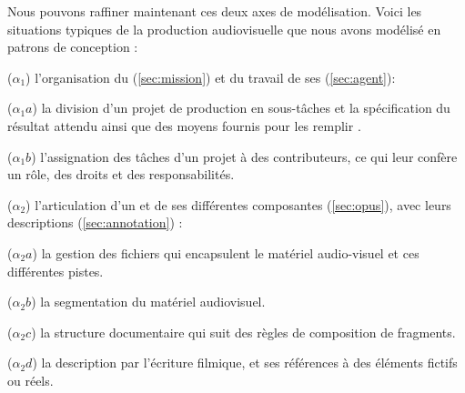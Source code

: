 Nous pouvons raffiner maintenant ces deux axes de modélisation. 
Voici les situations typiques de la production audiovisuelle que nous avons modélisé en patrons de conception : 
\begin{listeni}
	\item[($\alpha_1$)] l'organisation du  (\ref{sec:mission}) et du travail de ses  (\ref{sec:agent}): 
	\begin{liste}
		\item[($\alpha_1a$)] la division d'un projet de production en sous-tâches et la spécification du résultat attendu ainsi que des moyens fournis pour les remplir .

		\item[($\alpha_1b$)] l'assignation des tâches d'un projet à des contributeurs, ce qui leur confère un rôle, des droits et des responsabilités.
	\end{liste}

	\item[($\alpha_2$)] l'articulation d'un  et de ses différentes composantes (\ref{sec:opus}), avec leurs descriptions (\ref{sec:annotation}) : 
	\begin{liste}
		\item[($\alpha_2a$)] la gestion des fichiers qui encapsulent le matériel audio-visuel et ces différentes pistes.
		\item[($\alpha_2b$)] la segmentation du matériel audiovisuel.
		\item[($\alpha_2c$)] la structure documentaire qui suit des règles de composition de fragments. 
		\item[($\alpha_2d$)] la description par l'écriture filmique, et ses références à des éléments fictifs ou réels.
	\end{liste}
\end{listeni}


